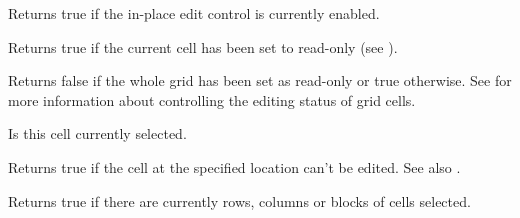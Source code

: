 \label{wxgridiscelleditcontrolenabled}


Returns true if the in-place edit control is currently enabled.



\label{wxgridiscurrentcellreadonly}


Returns true if the current cell has been set to read-only
(see ).



\label{wxgridiseditable}


Returns false if the whole grid has been set as read-only or true otherwise.
See  for more information about
controlling the editing status of grid cells.



\label{wxgridisinselection}



Is this cell currently selected.



\label{wxgridisreadonly}


Returns true if the cell at the specified location can't be edited.
See also .



\label{wxgridisselection}


Returns true if there are currently rows, columns or blocks of cells selected.



\label{wxgridisvisible}


